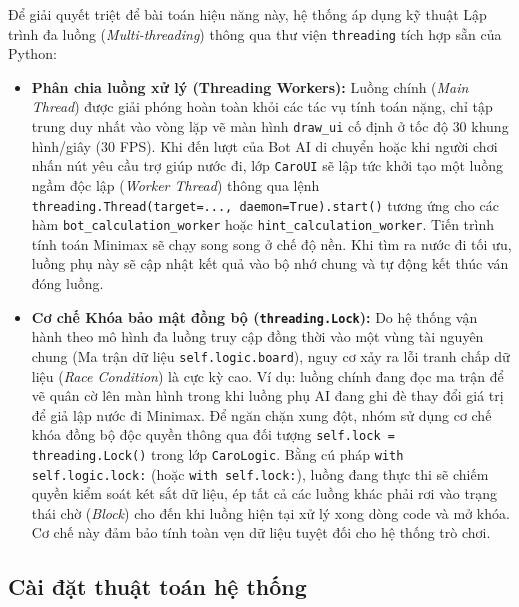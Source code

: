Để giải quyết triệt để bài toán hiệu năng này, hệ thống áp dụng kỹ thuật Lập trình đa luồng (\textit{Multi-threading}) thông qua thư viện \texttt{threading} tích hợp sẵn của Python:
\begin{itemize}
	\item \textbf{Phân chia luồng xử lý (Threading Workers):} Luồng chính (\textit{Main Thread}) được giải phóng hoàn toàn khỏi các tác vụ tính toán nặng, chỉ tập trung duy nhất vào vòng lặp vẽ màn hình \texttt{draw\_ui} cố định ở tốc độ $30$ khung hình/giây ($30$ FPS). Khi đến lượt của Bot AI di chuyển hoặc khi người chơi nhấn nút yêu cầu trợ giúp nước đi, lớp \texttt{CaroUI} sẽ lập tức khởi tạo một luồng ngầm độc lập (\textit{Worker Thread}) thông qua lệnh \texttt{threading.Thread(target=..., daemon=True).start()} tương ứng cho các hàm \texttt{bot\_calculation\_worker} hoặc \texttt{hint\_calculation\_worker}. Tiến trình tính toán Minimax sẽ chạy song song ở chế độ nền. Khi tìm ra nước đi tối ưu, luồng phụ này sẽ cập nhật kết quả vào bộ nhớ chung và tự động kết thúc ván đóng luồng.
	\item \textbf{Cơ chế Khóa bảo mật đồng bộ (\texttt{threading.Lock}):} Do hệ thống vận hành theo mô hình đa luồng truy cập đồng thời vào một vùng tài nguyên chung (Ma trận dữ liệu \texttt{self.logic.board}), nguy cơ xảy ra lỗi tranh chấp dữ liệu (\textit{Race Condition}) là cực kỳ cao. Ví dụ: luồng chính đang đọc ma trận để vẽ quân cờ lên màn hình trong khi luồng phụ AI đang ghi đè thay đổi giá trị để giả lập nước đi Minimax. Để ngăn chặn xung đột, nhóm sử dụng cơ chế khóa đồng bộ độc quyền thông qua đối tượng \texttt{self.lock = threading.Lock()} trong lớp \texttt{CaroLogic}. Bằng cú pháp \texttt{with self.logic.lock:} (hoặc \texttt{with self.lock:}), luồng đang thực thi sẽ chiếm quyền kiểm soát két sắt dữ liệu, ép tất cả các luồng khác phải rơi vào trạng thái chờ (\textit{Block}) cho đến khi luồng hiện tại xử lý xong dòng code và mở khóa. Cơ chế này đảm bảo tính toàn vẹn dữ liệu tuyệt đối cho hệ thống trò chơi.
\end{itemize}

\subsection{Cài đặt thuật toán hệ thống}

